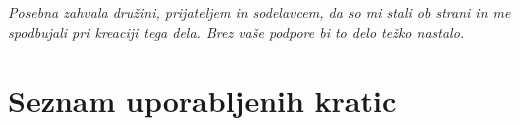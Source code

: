 \documentclass[a4paper, 12pt]{book}
\newcommand{\clearemptydoublepage}{\newpage{\pagestyle{empty}\cleardoublepage}}
\begin{document}

\vspace{2cm}

\clearemptydoublepage

\thispagestyle{empty}\mbox{}\vfill\null\it%
\noindent
Posebna zahvala družini, prijateljem in sodelavcem, da so mi stali ob strani in me spodbujali pri kreaciji tega dela. Brez vaše podpore bi to delo težko nastalo.
\rm\normalfont

\clearemptydoublepage

\pagestyle{empty}
\def\thepage{}%
\tableofcontents{}

\seznamslik


\clearemptydoublepage


\chapter*{Seznam uporabljenih kratic}  %
\end{document}
